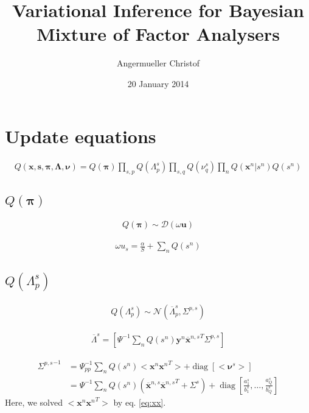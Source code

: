 \documentclass[a4paper]{article}
\author{Angermueller Christof}
\date{20 January 2014}
\title{Variational Inference for Bayesian Mixture of Factor Analysers}
\begin{document}
\maketitle

\newcommand{\bs}{\boldsymbol}
\newcommand{\Xp}{\bs{\pi}}
\newcommand{\Xbl}{\bar{\Lambda^s}}
\newcommand{\Xn}{\bs{\nu}^s}
\newcommand{\Xe}{\Psi}
\newcommand{\Xa}{\alpha}
\newcommand{\Xc}{\Xl{\Xl}^T}
\newcommand{\Xl}{\Lambda^s}
\newcommand{\Xlp}{\overline{\Lambda}^s}
\newcommand{\Xsp}{\Sigma^{p,s}}
\newcommand{\Xx}{\bs{x}^n}
\newcommand{\Xxm}{\overline{\bs{x}}^{n,s}}
\newcommand{\Xxs}{\Sigma^s}
\newcommand{\Xlm}{\overline{\Lambda}^s}
\newcommand{\Xls}{\Sigma^{p,s}}
\newcommand{\Xpsii}{\Psi^{-1}}
\newcommand{\Xy}{\bs{y}^n}
\newcommand{\Xs}{s^n}
\newcommand{\Xcov}{\operatorname{cov}}
\newcommand{\Xvar}{\operatorname{var}}
\newcommand{\Xtr}{\operatorname{tr}}
\newcommand{\Xdiag}{\operatorname{diag}}

\section{Update equations}
\begin{align}
  Q(\bs{x},\bs{s},\bs{\pi},\bs{\Lambda},\bs{\nu})=Q(\Xp)\prod_{s,p}Q(\Xl_p)\prod_{s,q}Q(\nu_q^s)\prod_n Q(\Xx|\Xs)Q(\Xs)
\end{align}

\subsection{$Q(\Xp)$}
\begin{align}
  Q(\Xp)\sim\mathcal{D}(\omega\bs{u})
\end{align}

\begin{align}
  \omega u_s=\frac{\alpha}{S}+\sum_n Q(s^n)
\end{align}

\subsection{$Q(\Xl_p)$}
\begin{align}
  Q(\Xl_p)\sim\mathcal{N}(\Xlm_p,\Xls)
\end{align}

\begin{align}
  \Xlm=\left[\Xpsii\sum_n Q(s^n)\Xy{\Xxm}^T\Xls\right]
\end{align}

\begin{align}
  {\Xls}^{-1}&=\Psi^{-1}_{pp}\sum_n Q(s^n)<\Xx {\Xx}^T>+\Xdiag[<\Xn>] \\
    &=\Psi^{-1}\sum_n Q(s^n)\left(\Xxm{\Xxm}^T+\Xxs\right)+\Xdiag[\frac{a^s_1}{b^s_1},\dots,\frac{a^s_Q}{b^s_Q}]
\end{align}
Here, we solved $<\Xx {\Xx}^T>$ by eq. \ref{eq:xx}.
 
\end{document}
